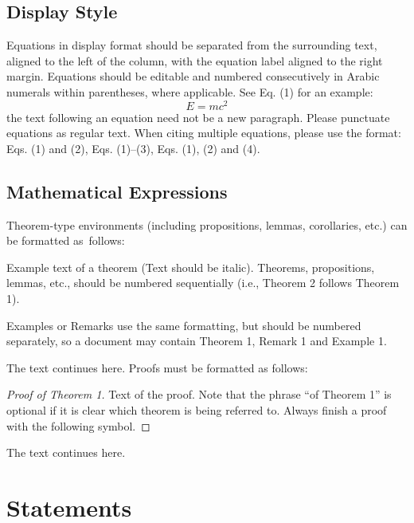 \documentclass[journal,article,submit,moreauthors,pdftex]{Definitions/tsp}
\begin{document}
\subsection{Display Style}\label{sect:s4dot2}
Equations in display format should be separated from the surrounding text, aligned to the left of the column, with the equation label aligned to the right margin. Equations should be editable and numbered consecutively in Arabic numerals within parentheses, where applicable. See Eq. (1) for an example:
\begin{equation}
E = mc^2
\tag{1}
\end{equation}
the text following an equation need not be a new paragraph. Please punctuate equations as regular text. When citing multiple equations, please use the format: Eqs. (1) and (2), Eqs. (1)--(3),  Eqs. (1), (2) and (4).

\subsection{Mathematical Expressions}\label{sect:s4dot3}
Theorem-type environments (including propositions, lemmas, corollaries, etc.) can be formatted as~follows:
\begin{Theorem}
Example text of a theorem (Text should be italic). Theorems, propositions, lemmas, etc., should be numbered sequentially (i.e., Theorem 2 follows Theorem 1). 
 
Examples or Remarks use the same formatting, but should be numbered separately, so a document may contain Theorem 1, Remark 1 and Example 1.
\end{Theorem}

The text continues here. Proofs must be formatted as follows:

\begin{proof}[Proof of Theorem 1]
 Text of the proof. Note that the phrase “of Theorem 1” is optional if it is clear which theorem is being referred to. Always finish a proof with the following symbol.
\end{proof}

The text continues here.


\section{Statements} \label{sect:s5}
\end{document}
